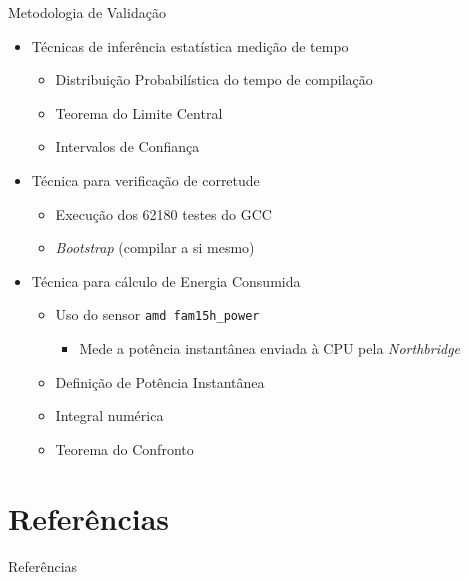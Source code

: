 \begin{frame}{Metodologia de Validação}
    \begin{itemize}
        \item Técnicas de inferência estatística medição de tempo
            \begin{itemize}
                \item Distribuição Probabilística do tempo de compilação
                \item Teorema do Limite Central
                \item Intervalos de Confiança
            \end{itemize}
        \item Técnica para verificação de corretude
            \begin{itemize}
                \item Execução dos 62180 testes do GCC
                \item \textit{Bootstrap} (compilar a si mesmo)
            \end{itemize}
        \item Técnica para cálculo de Energia Consumida
        \begin{itemize}
            \item Uso do sensor \texttt{amd fam15h\_power}
            \begin{itemize}
                \item Mede a potência instantânea enviada à CPU pela \textit{Northbridge}
            \end{itemize}

            \item Definição de Potência Instantânea
            \item Integral numérica
            \item Teorema do Confronto
        \end{itemize}
    \end{itemize}
\end{frame}

\section{Referências}

\begin{frame}[allowframebreaks]{Referências}
  \printbibliography
\end{frame}

